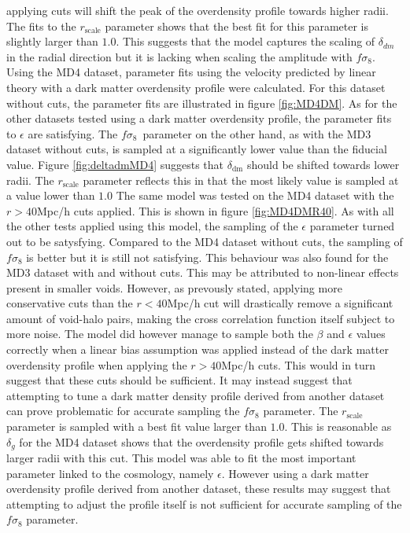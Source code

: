 applying cuts will shift the peak of the overdensity profile towards higher radii. The fits to the $r_{\mathrm{scale}}$ parameter shows that the best fit for this parameter is slightly larger than $1.0$. This suggests that the model captures the scaling of $\delta_{dm}$ in the radial direction but it is lacking when scaling the amplitude with $f\sigma_8$.\\\indent
Using the MD4 dataset, parameter fits using the velocity predicted by linear theory with a dark matter overdensity profile were calculated. For this dataset without cuts, the parameter fits are illustrated in figure \ref{fig:MD4DM}. As for the other datasets tested using a dark matter overdensity profile, the parameter fits to $\epsilon$ are satisfying. The $f\sigma_8$ parameter on the other hand, as with the MD3 dataset without cuts, is sampled at a significantly lower value than the fiducial value. Figure \ref{fig:deltadmMD4} suggests that $\delta_{\mathrm{dm}}$ should be shifted towards lower radii. The $r_{\mathrm{scale}}$ parameter reflects this in that the most likely value is sampled at a value lower than $1.0$ The same model was tested on the MD4 dataset with the $r>40$Mpc/h cuts applied. This is shown in figure \ref{fig:MD4DMR40}. As with all the other tests applied using this model, the sampling of the $\epsilon$ parameter turned out to be satysfying. Compared to the MD4 dataset without cuts, the sampling of $f\sigma_8$ is better but it is still not satisfying. This behaviour was also found for the MD3 dataset with and without cuts. This may be attributed to non-linear effects present in smaller voids. However, as prevously stated, applying more conservative cuts than the $r<40$Mpc/h cut will drastically remove a significant amount of void-halo pairs, making the cross correlation function itself subject to more noise. The model did however manage to sample both the $\beta$ and $\epsilon$ values correctly when a linear bias assumption was applied instead of the dark matter overdensity profile when applying the $r>40$Mpc/h cuts. This would in turn suggest that these cuts should be sufficient. It may instead suggest that attempting to tune a dark matter density profile derived from another dataset can prove problematic for accurate sampling the $f\sigma_8$ parameter. The $r_\mathrm{scale}$ parameter is sampled with a best fit value larger than $1.0$. This is reasonable as $\delta_g$ for the MD4 dataset shows that the overdensity profile gets shifted towards larger radii with this cut. This model was able to fit the most important parameter linked to the cosmology, namely $\epsilon$. However using a dark matter overdensity profile derived from another dataset, these results may suggest that attempting to adjust the profile itself is not sufficient for accurate sampling of the $f\sigma_8$ parameter.

